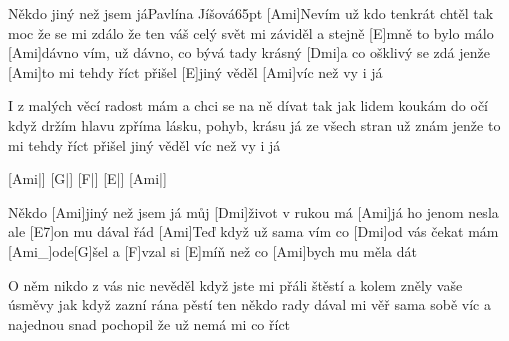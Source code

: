 \begin{song}{Někdo jiný než jsem já}{Pavlína Jíšová}{65pt}
%
[Ami]Nevím už kdo tenkrát chtěl tak moc že se mi zdálo
že ten váš celý svět mi záviděl a stejně [E]mně to bylo málo
[Ami]dávno vím, už dávno, co bývá tady krásný [Dmi]a co ošklivý se zdá
jenže [Ami]to mi tehdy říct přišel [E]jiný věděl [Ami]víc než vy i já

% 
I z malých věcí radost mám a chci se na ně dívat
tak jak lidem koukám do očí když držím hlavu zpříma
lásku, pohyb, krásu já ze všech stran už znám
jenže to mi tehdy říct přišel jiný věděl víc než vy i já

[Ami|]{} [G|]{} [F|]{} [E|]{} [Ami|]{}

\chorus%
Někdo [Ami]jiný než jsem já můj [Dmi]{}život v rukou má
[Ami]já ho jenom nesla ale [E7]on mu dával řád
[Ami]Teď když už sama vím co [Dmi]od vás čekat mám
[Ami_]{ode}[G]{šel} a [F]vzal si [E]míň než co [Ami]bych mu měla dát

%
O něm nikdo z vás nic nevěděl když jste mi přáli štěstí
a kolem zněly vaše úsměvy jak když zazní rána pěstí
ten někdo rady dával mi věř sama sobě víc
a najednou snad pochopil že už nemá mi co říct

\chorus
\end{song}
